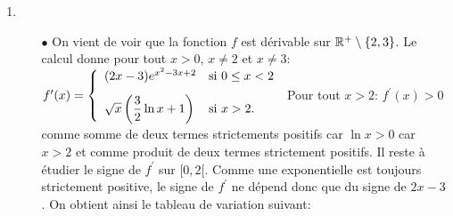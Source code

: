 \documentclass[a4paper, 11pt,reqno]{article}
\begin{document}
\begin{correction}
\begin{enumerate}
\begin{itemize}
			      \item[$\bullet$] La fonction $f$ est d\'erivable sur $\lbrack 0,2\lbrack$ comme somme et compos\'ee de fonctions d\'erivables. La fonction $f$ est d\'erivable sur $\rbrack 2,+\infty\lbrack\setminus\lbrace 3\rbrace$ comme sommes, compos\'ee et quotient de fonctions d\'erivables. \'Etudions la d\'erivabilit\'e en 2:
			            \begin{itemize}
				            \item[$\star$] La fonction $f$ est d\'erivable sur $\lbrack 0,2\rbrack$ comme somme et compos\'ee de fonctions d\'erivables. Ainsi elle est d\'erivable \`{a} gauche en 2 et $f^{\prime}_g(2)=(4-3)\times e^0=1$.
				            \item[$\star$] \'Etude de la d\'erivabilit\'e \`{a} droite en 2: pour tout $x>2$, on a: $\ddp\frac{f(x)-f(2)}{x-2}=1-\ddp\frac{1}{(x-2)\ln{(x-2)}}$. En posant $X=x-2$, on a par croissance compar\'ee que: $\lim\limits_{X\to 0^+} X\ln{X}=0^+$. Ainsi par propri\'et\'e sur les compos\'ee, quotient et somme de limites, on obtient que: $\lim\limits_{x\to 2^+} \ddp\frac{f(x)-f(2)}{x-2}=-\infty$. Ainsi la fonction $f$ ,n'est pas d\'erivable \`{a} droite en 2 et elle n'est donc pas d\'erivable en 2. De plus le point d'abscisse 2 est un point anguleux avec \`{a} droite une demi-tangente verticale.
			            \end{itemize}
			            Ainsi la fonction $f$ est d\'erivable sur $\R^+\setminus\lbrace 2,3\rbrace$.
		      \end{itemize}
		\item
		      \begin{itemize}
			      \item[$\bullet$] On vient de voir que la fonction $f$ est d\'erivable sur $\R^+\setminus\lbrace 2,3\rbrace$. Le calcul donne pour tout $x>0$, $x\not= 2$ et $x\not= 3$: $f^{\prime}(x)=\left\lbrace\begin{array}{ll}
					            (2x-3)e^{x^2-3x+2}                              & \hbox{si}\ 0\leq x< 2\vsec \\
					            \sqrt{x}\left(  \ddp\frac{3}{2}\ln{x}+1 \right) & \hbox{si}\ x>2.
				            \end{array}\right.$ Pour tout $x>2$: $f^{\prime}(x)>0$ comme somme de deux termes strictements positifs car $\ln{x}>0$ car $x>2$ et comme produit de deux termes strictement positifs. Il reste \`{a} \'etudier le signe de $f^{\prime}$ sur $\lbrack 0,2\lbrack$. Comme une exponentielle est toujours strictement positive, le signe de $f^{\prime}$ ne d\'epend donc que du signe de $2x-3$. On obtient ainsi le tableau de variation suivant:

\end{itemize}
\end{enumerate}
\end{correction}
\end{document}
